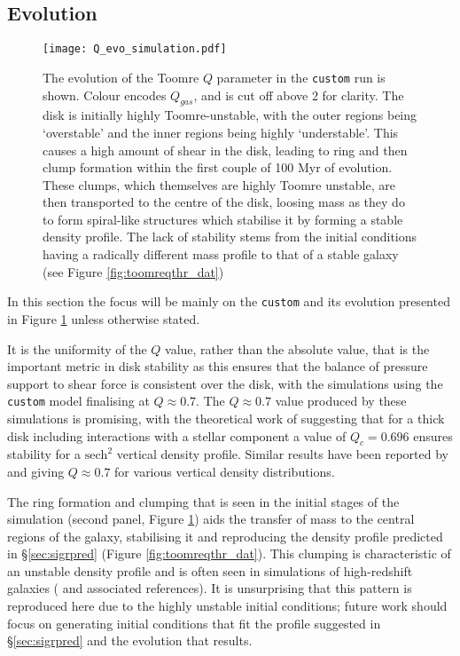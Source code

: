 \subsection{Evolution}

\begin{figure}[!ht]
    \texttt{[image: Q\_evo\_simulation.pdf]}
    \caption{The evolution of the Toomre $Q$ parameter in the {\tt custom} run is shown. Colour encodes $Q_{gas}$, and is cut off above $2$ for clarity. The disk is initially highly Toomre-unstable, with the outer regions being `overstable' and the inner regions being highly `understable'. This causes a high amount of shear in the disk, leading to ring and then clump formation within the first couple of 100 Myr of evolution. These clumps, which themselves are highly Toomre unstable, are then transported to the centre of the disk, loosing mass as they do to form spiral-like structures which stabilise it by forming a stable density profile. The lack of stability stems from the initial conditions having a radically different mass profile to that of a stable galaxy (see Figure \ref{fig:toomreqthr_dat})}
    \label{fig:toomqsimsmallfig}
\end{figure}

In this section the focus will be mainly on the {\tt custom} and its evolution presented in Figure \ref{fig:toomqsimsmallfig} unless otherwise stated.

It is the uniformity of the $Q$ value, rather than the absolute value, that is the important metric in disk stability as this ensures that the balance of pressure support to shear force is consistent over the disk, with the simulations using the {\tt custom} model finalising at $Q \approx 0.7$.
The $Q\approx 0.7$ value produced by these simulations is promising, with the theoretical work of \citet{behrendt_structure_2015} suggesting that for a thick disk including interactions with a stellar component a value of $Q_c = 0.696$ ensures stability for a $\mathrm{sech}^2$ vertical density profile.
Similar results have been reported by \citet{kim_three-dimensional_2002} and \citet{wang_equilibrium_2010} giving $Q \approx 0.7$ for various vertical density distributions.

The ring formation and clumping that is seen in the initial stages of the simulation (second panel, Figure \ref{fig:toomqsimsmallfig}) aids the transfer of mass to the central regions of the galaxy, stabilising it and reproducing the density profile predicted in \S\ref{sec:sigrpred} (Figure \ref{fig:toomreqthr_dat}).
This clumping is characteristic of an unstable density profile and is often seen in simulations of high-redshift galaxies (\citet{bournaud_bulge_2016} and associated references).
It is unsurprising that this pattern is reproduced here due to the highly unstable initial conditions; future work should focus on generating initial conditions that fit the profile suggested in \S \ref{sec:sigrpred} and the evolution that results.

